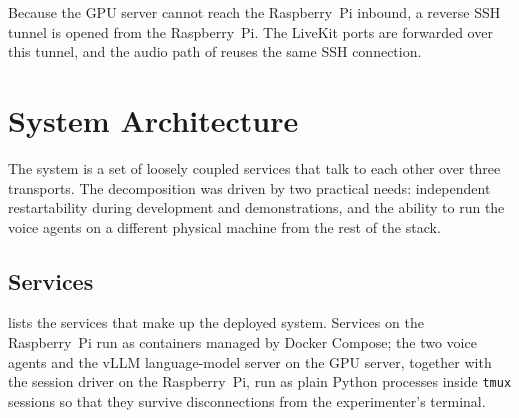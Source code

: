 Because the GPU server cannot reach the Raspberry~Pi inbound, a reverse SSH tunnel is opened from the Raspberry~Pi.
The LiveKit ports are forwarded over this tunnel, and the audio path of  reuses the same SSH connection.


\section{System Architecture}
\label{sec:architecture}

The system is a set of loosely coupled services that talk to each other over three transports.
The decomposition was driven by two practical needs: independent restartability during development and demonstrations, and the ability to run the voice agents on a different physical machine from the rest of the stack.

\subsection{Services}
\label{sec:services}

 lists the services that make up the deployed system.
Services on the Raspberry~Pi run as containers managed by Docker Compose; the two voice agents and the vLLM language-model server on the GPU server, together with the session driver on the Raspberry~Pi, run as plain Python processes inside \texttt{tmux} sessions so that they survive disconnections from the experimenter's terminal.


